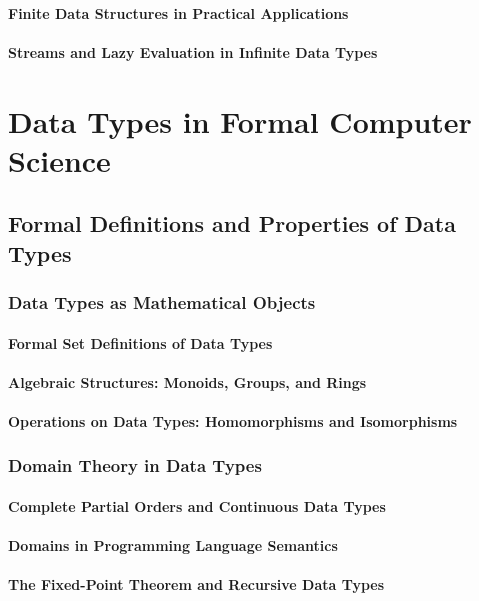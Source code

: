 \documentclass[12pt, oneside]{book}
\begin{document}
\subsubsection{Finite Data Structures in Practical Applications}
\subsubsection{Streams and Lazy Evaluation in Infinite Data Types}

\chapter{Data Types in Formal Computer Science}
\section{Formal Definitions and Properties of Data Types}
\subsection{Data Types as Mathematical Objects}
\subsubsection{Formal Set Definitions of Data Types}
\subsubsection{Algebraic Structures: Monoids, Groups, and Rings}
\subsubsection{Operations on Data Types: Homomorphisms and Isomorphisms}
\subsection{Domain Theory in Data Types}
\subsubsection{Complete Partial Orders and Continuous Data Types}
\subsubsection{Domains in Programming Language Semantics}
\subsubsection{The Fixed-Point Theorem and Recursive Data Types}
\end{document}
